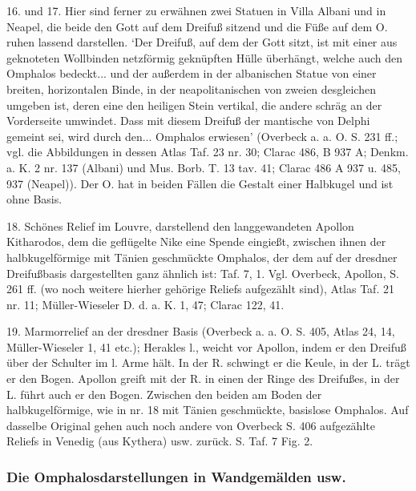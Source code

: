 \documentclass[a4paper, 11pt, oneside]{article}
\begin{document}
16. und 17. Hier sind ferner zu erwähnen zwei Statuen in Villa Albani und in Neapel, die beide den Gott auf dem Dreifuß sitzend und die Füße auf dem O. ruhen lassend darstellen. `Der Dreifuß, auf dem der Gott sitzt, ist mit einer aus geknoteten Wollbinden netzförmig geknüpften Hülle überhängt, welche auch den Omphalos bedeckt... und der außerdem in der albanischen Statue von einer breiten, horizontalen Binde, in der neapolitanischen von zweien desgleichen umgeben ist, deren eine den heiligen Stein vertikal, die andere schräg an der Vorderseite umwindet. Dass mit diesem Dreifuß der mantische von Delphi gemeint sei, wird durch den... Omphalos erwiesen' (Overbeck a. a. O. S. 231 ff.; vgl. die Abbildungen in dessen Atlas Taf. 23 nr. 30; Clarac 486, B 937 A; Denkm. a. K. 2 nr. 137 (Albani) und Mus. Borb. T. 13 tav. 41; Clarac 486 A 937 u. 485, 937 (Neapel)). Der O. hat in beiden Fällen die Gestalt einer Halbkugel und ist ohne Basis.

18. Schönes Relief im Louvre, darstellend den langgewandeten Apollon Kitharodos, dem die geflügelte Nike eine Spende eingießt, zwischen ihnen der halbkugelförmige mit Tänien geschmückte Omphalos, der dem auf der dresdner Dreifußbasis dargestellten ganz ähnlich ist: Taf. 7, 1. Vgl. Overbeck, Apollon, S. 261 ff. (wo noch weitere hierher gehörige Reliefs aufgezählt sind), Atlas Taf. 21 nr. 11; Müller-Wieseler D. d. a. K. 1, 47; Clarac 122, 41.

19. Marmorrelief an der dresdner Basis (Overbeck a. a. O. S. 405, Atlas 24, 14, Müller-Wieseler 1, 41 etc.); Herakles l., weicht vor Apollon, indem er den Dreifuß über der Schulter im l. Arme hält. In der R. schwingt er die Keule, in der L. trägt er den Bogen. Apollon greift mit der R. in einen der Ringe des Dreifußes, in der L. führt auch er den Bogen. Zwischen den beiden am Boden der halbkugelförmige, wie in nr. 18 mit Tänien geschmückte, basislose Omphalos. Auf dasselbe Original gehen auch noch andere von Overbeck S. 406 aufgezählte Reliefs in Venedig (aus Kythera) usw. zurück. S. Taf. 7 Fig. 2.

\subsubsection{Die Omphalosdarstellungen in Wandgemälden usw.}
\end{document}
